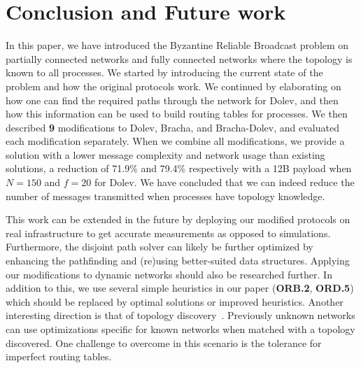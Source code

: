 \section{Conclusion and Future work}
\label{conclusion}
In this paper, we have introduced the Byzantine Reliable Broadcast problem on partially connected networks and fully connected networks where the topology is known to all processes. We started by introducing the current state of the problem and how the original protocols work. We continued by elaborating on how one can find the required paths through the network for Dolev, and then how this information can be used to build routing tables for processes. We then described \textbf{9} modifications to Dolev, Bracha, and Bracha-Dolev, and evaluated each modification separately. When we combine all modifications, we provide a solution with a lower message complexity and network usage than existing solutions, a reduction of 71.9\% and 79.4\% respectively with a 12B payload when $N=150$ and $f=20$ for Dolev.
We have concluded that we can indeed reduce the number of messages transmitted when processes have topology knowledge.

This work can be extended in the future by deploying our modified protocols on real infrastructure to get accurate measurements as opposed to simulations. Furthermore, the disjoint path solver can likely be further optimized by enhancing the pathfinding and (re)using better-suited data structures. Applying our modifications to dynamic networks should also be researched further. In addition to this, we use several simple heuristics in our paper (\textbf{ORB.2}, \textbf{ORD.5}) which should be replaced by optimal solutions or improved heuristics. Another interesting direction is that of topology discovery~\cite{topology-discovery,explorer,explorer2}. Previously unknown networks can use optimizations specific for known networks when matched with a topology discovered. One challenge to overcome in this scenario is the tolerance for imperfect routing tables.

